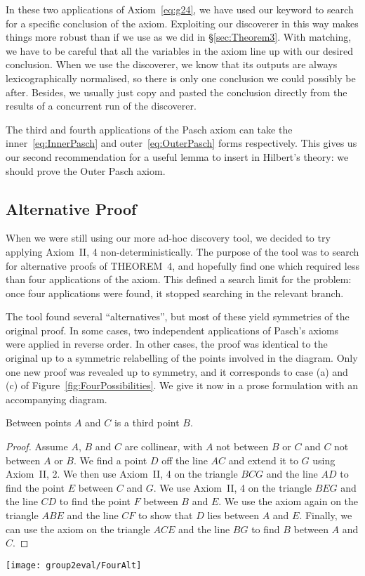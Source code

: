 In these two applications of Axiom~\ref{eq:g24}, we have used our  keyword to search for a specific conclusion of the axiom. Exploiting our discoverer in this way makes things more robust than if we use  as we did in \S\ref{sec:Theorem3}. With matching, we have to be careful that all the variables in the axiom line up with our desired conclusion. When we use the discoverer, we know that its outputs are always lexicographically normalised, so there is only one conclusion we could possibly be after. Besides, we usually just copy and pasted the conclusion directly from the results of a concurrent run of the discoverer.

The third and fourth applications of the Pasch axiom can take the inner~\eqref{eq:InnerPasch} and outer~\eqref{eq:OuterPasch} forms respectively. This gives us our second recommendation for a useful lemma to insert in Hilbert's theory: we should prove the Outer Pasch axiom.

\subsection{Alternative Proof}\label{sec:FourAlternative}
When we were still using our more ad-hoc discovery tool, we decided to try applying Axiom~II, 4 non-deterministically. The purpose of the tool was to search for alternative proofs of THEOREM~4, and hopefully find one which required less than four applications of the axiom. This defined a search limit for the problem: once four applications were found, it stopped searching in the relevant branch. 

The tool found several ``alternatives'', but most of these yield symmetries of the original proof. In some cases, two independent applications of Pasch's axioms were applied in reverse order. In other cases, the proof was identical to the original up to a symmetric relabelling of the points involved in the diagram. Only one new proof was revealed up to symmetry, and it corresponds to case (a) and (c) of Figure~\ref{fig:FourPossibilities}. We give it now in a prose formulation with an accompanying diagram.

\begin{proposition}
Between points $A$ and $C$ is a third point $B$.
\end{proposition}
\begin{proof}Assume $A$, $B$ and $C$ are collinear, with $A$ not between $B$ or $C$ and $C$ not between $A$ or $B$. We find a point $D$ off the line $AC$ and extend it to $G$ using Axiom~II, 2. We then use Axiom~II, 4 on the triangle $BCG$ and the line $AD$ to find the point $E$ between $C$ and $G$. We use Axiom~II, 4 on the triangle $BEG$ and the line $CD$ to find the point $F$ between $B$ and $E$. We use the axiom again on the triangle $ABE$ and the line $CF$ to show that $D$ lies between $A$ and $E$. Finally, we can use the axiom on the triangle $ACE$ and the line $BG$ to find $B$ between $A$ and $C$.
\end{proof}
\begin{center}\texttt{[image: group2eval/FourAlt]}
\end{center}


